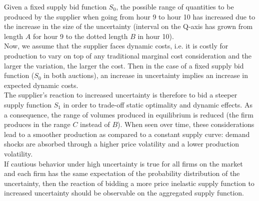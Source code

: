 Given a fixed supply bid function $S_0$, the possible range of quantities to be produced by the supplier when going from hour 9 to hour 10 has increased due to the increase in the size of the uncertainty (interval on the Q-axis has grown from length $A$ for hour 9 to the dotted length $B$ in hour 10).\\

Now, we assume that the supplier faces dynamic costs, i.e. it is costly for production to vary on top of any traditional marginal cost consideration and the larger the variation, the larger the cost.  Then in the case of a fixed supply bid function ($S_0$ in both auctions), an increase in uncertainty implies an increase in expected dynamic costs. \\

The supplier's reaction to increased uncertainty is therefore to bid a steeper supply function $S_1$ in order to trade-off static optimality and dynamic effects. As a consequence, the range of volumes produced in equilibrium is reduced (the firm produces in the range $C$ instead of $B$). When seen over time, these considerations lead to a smoother production as compared to a constant supply curve: demand shocks are absorbed through a higher price volatility and a lower production volatility. \\%


If cautious behavior under high uncertainty is true for all firms on the market and each firm has the same expectation of the probability distribution of the uncertainty, then the reaction of bidding a more price inelastic supply function to increased uncertainty should be observable on the aggregated supply function. \\

